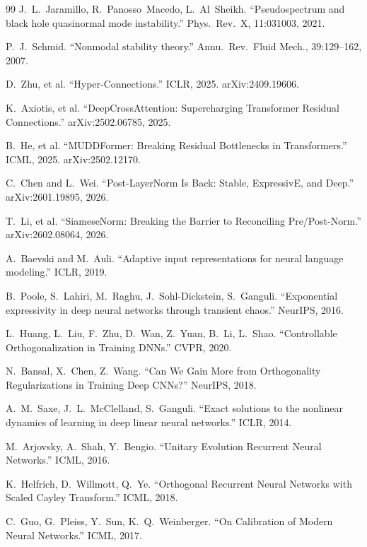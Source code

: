 \documentclass[11pt,a4paper]{article}
\theoremstyle{definition}
\begin{document}
\begin{thebibliography}{99}
    J.~L.~Jaramillo, R.~Panosso~Macedo, L.~Al~Sheikh.
    ``Pseudospectrum and black hole quasinormal mode instability.''
    Phys.\ Rev.\ X, 11:031003, 2021.

    P.~J.~Schmid.
    ``Nonmodal stability theory.''
    Annu.\ Rev.\ Fluid Mech., 39:129--162, 2007.

    D.~Zhu, et al.
    ``Hyper-Connections.''
    ICLR, 2025. arXiv:2409.19606.

    K.~Axiotis, et al.
    ``DeepCrossAttention: Supercharging Transformer Residual Connections.''
    arXiv:2502.06785, 2025.

    B.~He, et al.
    ``MUDDFormer: Breaking Residual Bottlenecks in Transformers.''
    ICML, 2025. arXiv:2502.12170.

    C.~Chen and L.~Wei.
    ``Post-LayerNorm Is Back: Stable, ExpressivE, and Deep.''
    arXiv:2601.19895, 2026.

    T.~Li, et al.
    ``SiameseNorm: Breaking the Barrier to Reconciling Pre/Post-Norm.''
    arXiv:2602.08064, 2026.

    A.~Baevski and M.~Auli.
    ``Adaptive input representations for neural language modeling.''
    ICLR, 2019.

    B.~Poole, S.~Lahiri, M.~Raghu, J.~Sohl-Dickstein, S.~Ganguli.
    ``Exponential expressivity in deep neural networks through
    transient chaos.''
    NeurIPS, 2016.

    L.~Huang, L.~Liu, F.~Zhu, D.~Wan, Z.~Yuan, B.~Li, L.~Shao.
    ``Controllable Orthogonalization in Training DNNs.''
    CVPR, 2020.

    N.~Bansal, X.~Chen, Z.~Wang.
    ``Can We Gain More from Orthogonality Regularizations in
    Training Deep CNNs?''
    NeurIPS, 2018.

    A.~M.~Saxe, J.~L.~McClelland, S.~Ganguli.
    ``Exact solutions to the nonlinear dynamics of learning in
    deep linear neural networks.''
    ICLR, 2014.

    M.~Arjovsky, A.~Shah, Y.~Bengio.
    ``Unitary Evolution Recurrent Neural Networks.''
    ICML, 2016.

    K.~Helfrich, D.~Willmott, Q.~Ye.
    ``Orthogonal Recurrent Neural Networks with Scaled Cayley Transform.''
    ICML, 2018.

    C.~Guo, G.~Pleiss, Y.~Sun, K.~Q.~Weinberger.
    ``On Calibration of Modern Neural Networks.''
    ICML, 2017.
\end{thebibliography}
\end{document}
